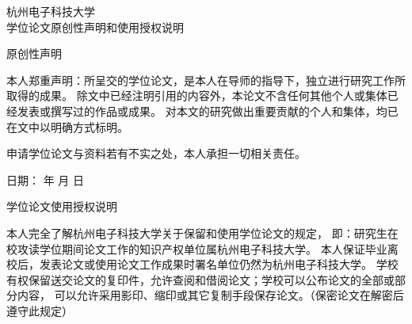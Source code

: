   {
    \vspace*{-12\p@}
    \begin{center}
      \large
      杭州电子科技大学\\[1ex] 学位论文原创性声明和使用授权说明
    \end{center}
    \vspace*{20\p@}
    \begin{center}
      \semilarge 原创性声明
    \end{center}
    \par \vspace*{.4\baselineskip}
    \begin{spacing}{1.65}
      本人郑重声明：所呈交的学位论文，是本人在导师的指导下，独立进行研究工作所取得的成果。
      除文中已经注明引用的内容外，本论文不含任何其他个人或集体已经发表或撰写过的作品或成果。
      对本文的研究做出重要贡献的个人和集体，均已在文中以明确方式标明。\par
      \noindent 申请学位论文与资料若有不实之处，本人承担一切相关责任。
      \par \vspace*{1.25\baselineskip}
      \noindent {}
      日期：
       年
       月
       日
      \par\vspace*{20\p@}
      \begin{center}
        \semilarge 学位论文使用授权说明
      \end{center}
      \par \vspace*{.4\baselineskip}
      \begin{spacing}{1.65}
        本人完全了解杭州电子科技大学关于保留和使用学位论文的规定，
        即：研究生在校攻读学位期间论文工作的知识产权单位属杭州电子科技大学。
        本人保证毕业离校后，发表论文或使用论文工作成果时署名单位仍然为杭州电子科技大学。
        学校有权保留送交论文的复印件，允许查阅和借阅论文；学校可以公布论文的全部或部分内容，
        可以允许采用影印、缩印或其它复制手段保存论文。（保密论文在解密后遵守此规定）

\end{spacing}
\end{spacing}}
